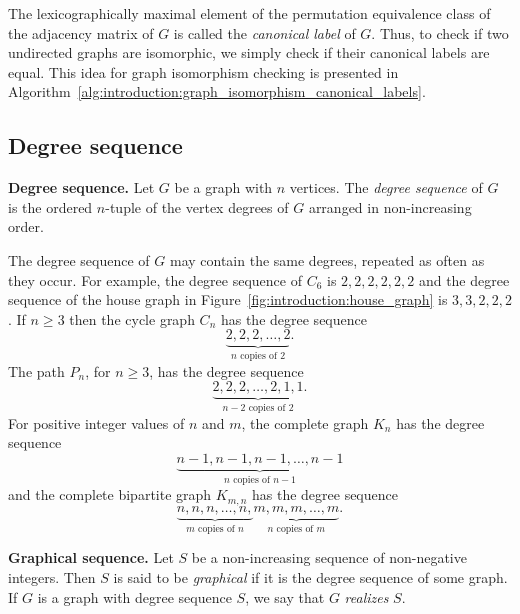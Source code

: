 The lexicographically maximal element of the permutation equivalence
class of the adjacency matrix of $G$ is called the
\emph{canonical label} of $G$. Thus, to check if two undirected graphs
are isomorphic, we simply check if their canonical labels are equal.
This idea for graph isomorphism checking is presented in
Algorithm~\ref{alg:introduction:graph_isomorphism_canonical_labels}.



\subsection{Degree sequence}

\begin{definition}
\textbf{Degree sequence.}
Let $G$ be a graph with $n$ vertices. The \emph{degree sequence} of
$G$ is the ordered $n$-tuple of the vertex degrees of $G$ arranged in
non-increasing order.
\end{definition}

The degree sequence of $G$ may contain the same degrees, repeated as
often as they occur. For example, the degree sequence of $C_6$ is
$2, 2, 2, 2, 2, 2$ and the degree sequence of the house graph in
Figure~\ref{fig:introduction:house_graph} is $3, 3, 2, 2, 2$. If
$n \geq 3$ then the cycle graph $C_n$ has the degree sequence
\[
\underbrace{2, 2, 2, \dots, 2}_{n \text{ copies of } 2}.
\]
The path $P_n$, for $n \geq 3$, has the degree sequence
\[
\underbrace{2, 2, 2, \dots, 2, 1, 1}_{n - 2 \text{ copies of } 2}.
\]
For positive integer values of $n$ and $m$, the complete graph $K_n$
has the degree sequence
\[
\underbrace{n-1, n-1, n-1, \dots, n-1}_{n \text{ copies of } n-1}
\]
and the complete bipartite graph $K_{m,n}$ has the degree sequence
\[
\underbrace{n, n, n, \dots, n,}_{m \text{ copies of } n}
\underbrace{m, m, m, \dots, m}_{n \text{ copies of } m}.
\]

\begin{definition}
\textbf{Graphical sequence.}
Let $S$ be a non-increasing sequence of non-negative integers. Then
$S$ is said to be \emph{graphical} if it is the degree sequence of
some graph. If $G$ is a graph with degree sequence $S$, we say that
$G$ \emph{realizes} $S$.
\end{definition}


